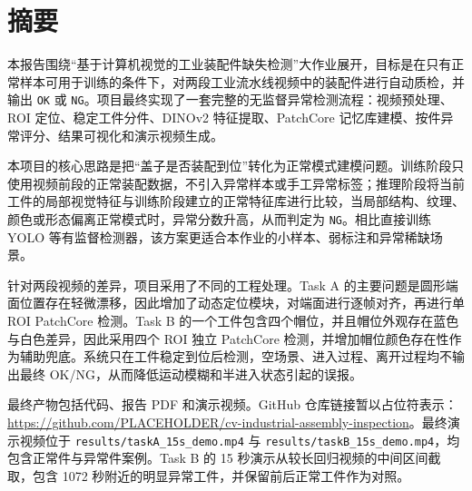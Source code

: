 \documentclass[12pt,hyperref,a4paper,UTF8,fontset=fandol]{ctexart}
\begin{document}
\cover
\thispagestyle{empty}

\newpage
{}
\tableofcontents

\newpage
{}

\section{摘要}

本报告围绕“基于计算机视觉的工业装配件缺失检测”大作业展开，目标是在只有正常样本可用于训练的条件下，对两段工业流水线视频中的装配件进行自动质检，并输出 \texttt{OK} 或 \texttt{NG}。项目最终实现了一套完整的无监督异常检测流程：视频预处理、ROI 定位、稳定工件分件、DINOv2 特征提取、PatchCore 记忆库建模、按件异常评分、结果可视化和演示视频生成。

本项目的核心思路是把“盖子是否装配到位”转化为正常模式建模问题。训练阶段只使用视频前段的正常装配数据，不引入异常样本或手工异常标签；推理阶段将当前工件的局部视觉特征与训练阶段建立的正常特征库进行比较，当局部结构、纹理、颜色或形态偏离正常模式时，异常分数升高，从而判定为 \texttt{NG}。相比直接训练 YOLO 等有监督检测器，该方案更适合本作业的小样本、弱标注和异常稀缺场景。

针对两段视频的差异，项目采用了不同的工程处理。Task A 的主要问题是圆形端面位置存在轻微漂移，因此增加了动态定位模块，对端面进行逐帧对齐，再进行单 ROI PatchCore 检测。Task B 的一个工件包含四个帽位，并且帽位外观存在蓝色与白色差异，因此采用四个 ROI 独立 PatchCore 检测，并增加帽位颜色存在性作为辅助兜底。系统只在工件稳定到位后检测，空场景、进入过程、离开过程均不输出最终 OK/NG，从而降低运动模糊和半进入状态引起的误报。

最终产物包括代码、报告 PDF 和演示视频。GitHub 仓库链接暂以占位符表示：\url{https://github.com/PLACEHOLDER/cv-industrial-assembly-inspection}。最终演示视频位于 \texttt{results/taskA\_15s\_demo.mp4} 与 \texttt{results/taskB\_15s\_demo.mp4}，均包含正常件与异常件案例。Task B 的 15 秒演示从较长回归视频的中间区间截取，包含 1072 秒附近的明显异常工件，并保留前后正常工件作为对照。

\end{document}
